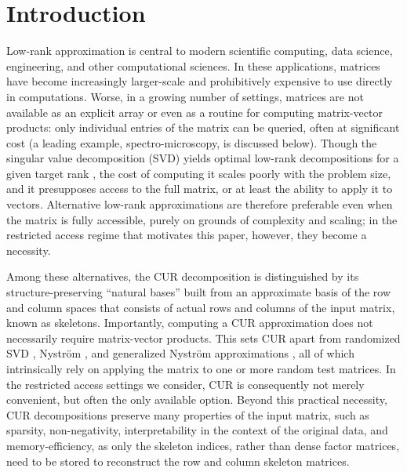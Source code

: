 \documentclass[11pt]{article}
\begin{document}
\section{Introduction}
Low-rank approximation is central to modern scientific computing, data science, engineering, and other computational sciences.
In these applications, matrices have become increasingly larger-scale and prohibitively expensive to use directly in computations. Worse, in a growing number of settings, matrices are not available as an explicit array or even as a routine for computing matrix-vector products: only individual entries of the matrix can be queried, often at significant cost (a leading example, spectro-microscopy, is discussed below).
Though the singular value decomposition (SVD) yields optimal low-rank decompositions for a given target rank \cite{eckart1936}, the cost of computing it scales poorly with the problem size, and it presupposes access to the full matrix, or at least the ability to apply it to vectors.
Alternative low-rank approximations are therefore preferable even when the matrix is fully accessible, purely on grounds of complexity and scaling; in the restricted access regime that motivates this paper, however, they become a necessity.

Among these alternatives, the CUR decomposition \cite{DrineasMahoney2009} is distinguished by its structure-preserving ``natural bases'' built from an approximate basis of the row and column spaces that consists of actual rows and columns of the input matrix, known as skeletons. Importantly, computing a CUR approximation does not necessarily require matrix-vector products.
This sets CUR apart from randomized SVD \cite{halko2011finding}, Nystr\"om \cite{williams20000}, and generalized Nystr\"om approximations \cite{nakatsukasaFastStableRandomized2020}, all of which intrinsically rely on applying the matrix to one or more random test matrices. In the restricted access settings we consider, CUR is consequently not merely convenient, but often the only available option.
Beyond this practical necessity, CUR decompositions preserve many properties of the input matrix, such as sparsity, non-negativity, interpretability in the context of the original data, and memory-efficiency, as only the skeleton indices, rather than dense factor matrices, need to be stored to reconstruct the row and column skeleton matrices.
\end{document}
